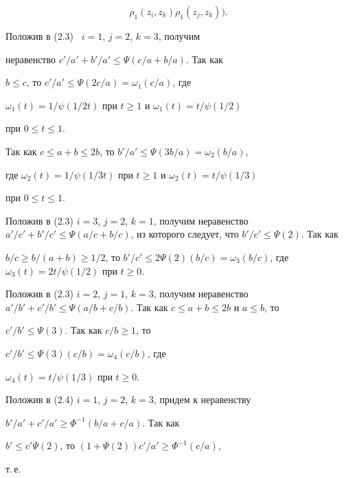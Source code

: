 \begin{pf}
\begin{equation}
{\rho_1(z_i, z_k)}{\rho_1(z_j, z_k)} \bigg).


\end{equation}





Положив в (2.3) \ $i=1$, $j=2$, $k=3$, получим 


неравенство $c'/a'+b'/a' \leq \Psi(c/a+b/a) $. Так как 


$b \leq c$, то $c'/a' \leq \Psi(2c/a)=\omega_1(c/a)$, где 


$\omega_1(t)=1/\psi(1/2t)$ при $t \geq 1$ и $\omega_1(t)=t/\psi(1/2)$ 


при $0\leq t \leq 1$.





Так как $c\leq a+b \leq 2b$, то $b'/a' \leq \Psi(3b/a)=\omega_2(b/a)$, 


где $\omega_2(t)=1/\psi(1/3t)$ при $t\geq 1$ и $\omega_2(t)=t/\psi(1/3)$ 


при $0\leq t \leq 1$.





Положив в (2.3) $i=3$, $j=2$, $k=1$, получим неравенство $a'/c'+b'/c' \leq 


\Psi(a/c+b/c)$, из которого следует, что $b'/c' \leq \Psi(2)$. Так как 


$b/c \geq b/(a+b) \geq 1/2$, то $b'/c' \leq 2\Psi(2) (b/c)=


\omega_3(b/c)$, где $\omega_3(t)=2t/\psi(1/2)$ при $t\geq 0$.





Положив в (2.3) $i=2$, $j=1$, $k=3$, получим неравенство $a'/b'+c'/b' \leq 


\Psi(a/b+c/b)$. Так как $c \leq a+b \leq 2b$ и $a\leq b$, то 


$c'/b' \leq \Psi(3)$. Так как $c/b \geq 1$, то 


$c'/b' \leq \Psi(3) (c/b)=\omega_4(c/b)$, где 


$\omega_4(t)=t/\psi(1/3)$ при $t\geq 0$.





Положив в (2.4) $i=1$, $j=2$, $k=3$, придем к неравенству 


$b'/a'+c'/a' \geq \Phi^{-1}(b/a+c/a)$. Так как 


$b' \leq c'\Psi(2)$, то $(1+\Psi(2)) c'/a' \geq \Phi^{-1}(c/a)$, 


т.\,е.



\end{pf}
